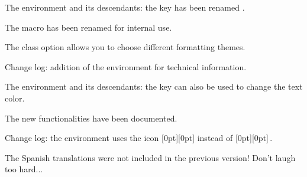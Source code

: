 \documentclass{tutodoc}
\begin{document}
\small

\begin{tdocbreak}
    \item The  environment and its descendants: the  key has been renamed .

    \item The macro  has been renamed  for internal use.
\end{tdocbreak}


\begin{tdocnew}
    \item The  class option allows you to choose different formatting themes.

    \item Change log: addition of the  environment for technical information.

    \item The  environment and its descendants: the  key can also be used to change the text color.

    \item The new functionalities have been documented.
\end{tdocnew}


\begin{tdocupdate}
    \item Change log: the  environment uses the icon
    \raisebox{0pt}[0pt][0pt]{}
    instead of
    \raisebox{0pt}[0pt][0pt]{\fbox{\faMagic}}\,.
\end{tdocupdate}


\begin{tdocfix}
    \item The Spanish translations were not included in the previous version! Don't laugh too hard...
\end{tdocfix}
\end{document}

